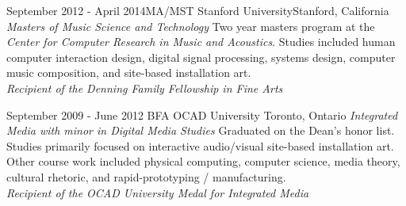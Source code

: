 \documentclass[10pt,a4paper,sans]{moderncv}   %
\begin{document}
\cventry
  {September 2012 - April 2014}{MA/MST}
  {Stanford University}{Stanford, California}
  {\textit{Masters of Music Science and Technology}}
  {Two year masters program at the \textit{Center for Computer Research in Music and Acoustics}.  Studies included human computer interaction design, digital signal processing, systems design, computer music composition, and site-based installation art. \\\textit{Recipient of the Denning Family Fellowship in Fine Arts }}

\cventry
  {September 2009 - June 2012}
  {BFA}
  {OCAD University}
  {Toronto, Ontario}
  {\textit{Integrated Media with minor in Digital Media Studies}}
  {Graduated on the Dean's honor list. Studies primarily focused on interactive audio/visual site-based installation art.  Other course work included physical computing, computer science, media theory, cultural rhetoric, and rapid-prototyping / manufacturing. \\\textit{Recipient of the OCAD University Medal for Integrated Media }}


%
%
%
%
%
\end{document}
